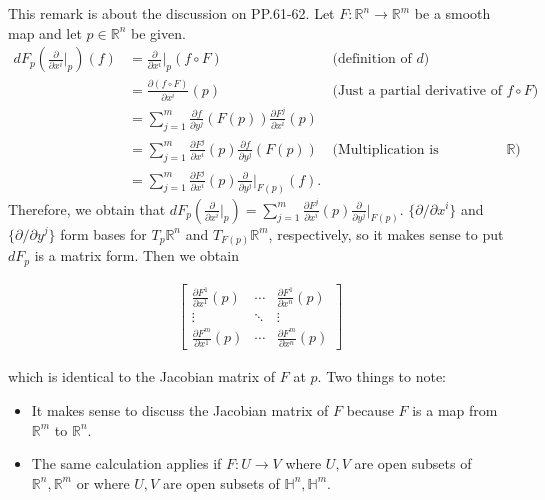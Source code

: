 \begin{rem}
  This remark is about the discussion on PP.61-62.
  Let $F: \mathbb{R}^n \rightarrow \mathbb{R}^m$ be a smooth map and let $p \in \mathbb{R}^n$ be given.
  \begin{align}
    dF_p(\frac{\partial}{\partial x^i}\Big\vert_p)(f) 
      &= \frac{\partial}{\partial x^i}\Big\vert_p(f \circ F) & \text{(definition of $d$)} \\
      &= \frac{\partial (f \circ F)}{\partial x^i}(p) & \text{(Just a partial derivative of $f \circ F$)} \\
      &= \sum_{j=1}^{m} \frac{\partial f}{\partial y^j}(F(p))\frac{\partial F^j}{\partial x^i}(p) \\
      &= \sum_{j=1}^{m} \frac{\partial F^j}{\partial x^i}(p)\frac{\partial f}{\partial y^j}(F(p)) & \text{(Multiplication is commutative in $\mathbb{R}$)} \\
      &= \sum_{j=1}^{m} \frac{\partial F^j}{\partial x^i}(p)\frac{\partial}{\partial y^j}\Big\vert_{F(p)}(f).
  \end{align}
  Therefore, we obtain that $dF_p(\frac{\partial}{\partial x^i}\big\vert_p) = \sum_{j=1}^{m} \frac{\partial F^j}{\partial x^i}(p)\frac{\partial}{\partial y^j}\big\vert_{F(p)}$.
  $\{ \partial / \partial x^i \}$ and $\{ \partial / \partial y^j \}$ form bases for $T_p\mathbb{R}^n$ and $T_{F(p)}\mathbb{R}^m$, respectively, so it makes sense to put $dF_p$ is a matrix form.
  Then we obtain

  \begin{align*}
    \begin{bmatrix}
      \frac{\partial F^1}{\partial x^1}(p) & \cdots & \frac{\partial F^1}{\partial x^n}(p) \\
      \vdots & \ddots & \vdots \\
      \frac{\partial F^m}{\partial x^1}(p) & \cdots & \frac{\partial F^m}{\partial x^n}(p)
    \end{bmatrix}
  \end{align*}

  which is identical to the Jacobian matrix of $F$ at $p$.
  Two things to note:
  \begin{itemize}
    \item
      It makes sense to discuss the Jacobian matrix of $F$ because $F$ is a map from $\mathbb{R}^m$ to $\mathbb{R}^n$.
    \item
      The same calculation applies if $F: U \rightarrow V$ where $U, V$ are open subsets of $\mathbb{R}^n, \mathbb{R}^m$ or where $U, V$ are open subsets of $\mathbb{H}^n, \mathbb{H}^m$.
  \end{itemize}


\end{rem}
